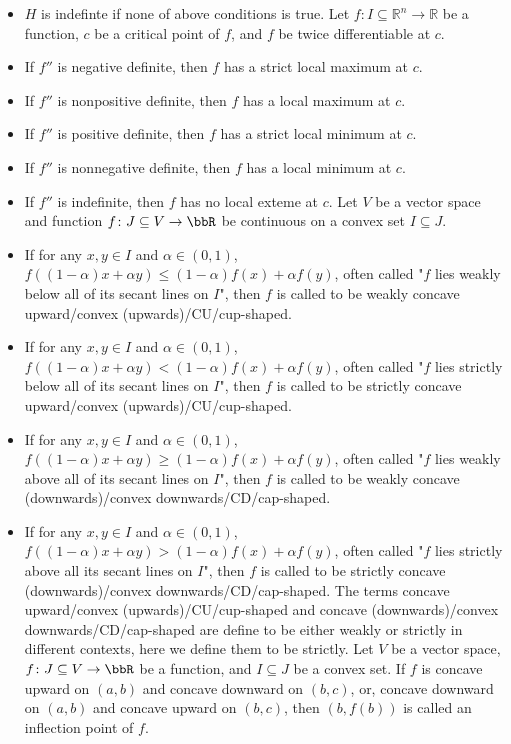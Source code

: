 \documentclass[a4paper,12pt]{report}
\begin{document}
\begin{itemize}
\begin{itemize}
\item $H$ is indefinte if none of above conditions is true.
\eit
{}
Let $f\colon I\subseteq\mathbb{R}^n\to\mathbb{R}$ be a function, $c$ be a critical point of $f$, and $f$ be twice differentiable at $c$.
\bit
\item If $f''$ is negative definite, then $f$ has a strict local maximum at $c$.
\item If $f''$ is nonpositive definite, then $f$ has a local maximum at $c$.
\item If $f''$ is positive definite, then $f$ has a strict local minimum at $c$.
\item If $f''$ is nonnegative definite, then $f$ has a local minimum at $c$.
\item If $f''$ is indefinite, then $f$ has no local exteme at $c$.
\eit
{}
Let $V$ be a vector space and function $f\colon J\subseteq V\to\bbR$ be continuous on a convex set $I\subseteq J$.
\bit
\item If for any $x,y\in I$ and $\alpha\in(0,1)$, $f((1-\alpha)x+\alpha y)\leq (1-\alpha)f(x)+\alpha f(y)$, often called "$f$ lies weakly below all of its secant lines on $I$", then $f$ is called to be weakly concave upward/convex (upwards)/CU/cup-shaped.
\item If for any $x,y\in I$ and $\alpha\in(0,1)$, $f((1-\alpha)x+\alpha y)<(1-\alpha)f(x)+\alpha f(y)$, often called "$f$ lies strictly below all of its secant lines on $I$", then $f$ is called to be strictly concave upward/convex (upwards)/CU/cup-shaped.
\item If for any $x,y\in I$ and $\alpha\in(0,1)$, $f((1-\alpha)x+\alpha y)\geq (1-\alpha)f(x)+\alpha f(y)$, often called "$f$ lies weakly above all of its secant lines on $I$", then $f$ is called to be weakly concave (downwards)/convex downwards/CD/cap-shaped.
\item If for any $x,y\in I$ and $\alpha\in(0,1)$, $f((1-\alpha)x+\alpha y)>(1-\alpha)f(x)+\alpha f(y)$, often called "$f$ lies strictly above all its secant lines on $I$", then $f$ is called to be strictly concave (downwards)/convex downwards/CD/cap-shaped.
\eit
The terms concave upward/convex (upwards)/CU/cup-shaped and concave (downwards)/convex downwards/CD/cap-shaped are define to be either weakly or strictly in different contexts, here we define them to be strictly.
Let $V$ be a vector space, $f\colon J\subseteq V\to\bbR$ be a function, and $I\subseteq J$ be a convex set. If $f$ is concave upward on $(a,b)$ and concave downward on $(b,c)$, or, concave downward on $(a,b)$ and concave upward on $(b,c)$, then $(b,f(b))$ is called an inflection point of $f$.

\end{itemize}
\end{itemize}
\end{document}
